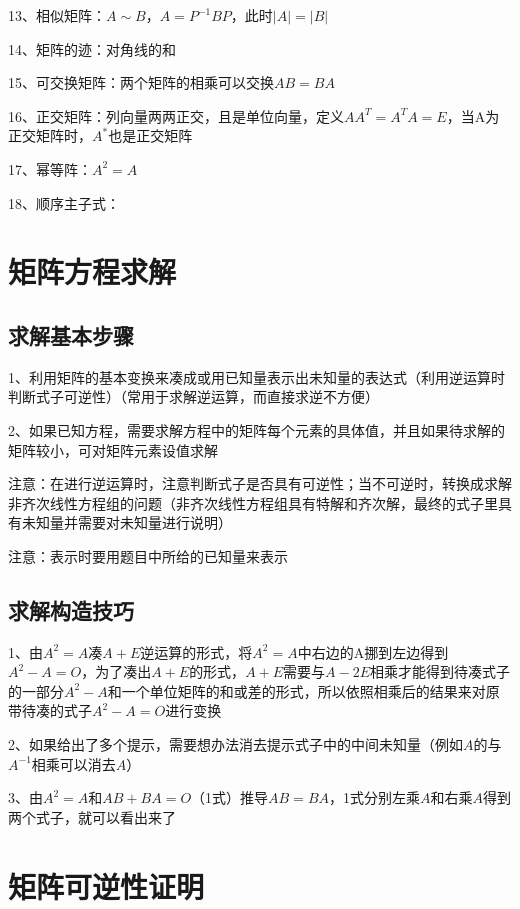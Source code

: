 13、相似矩阵：$ A \sim B $，$ A=P^{-1}BP $，此时$ |A|=|B| $

14、矩阵的迹：对角线的和

15、可交换矩阵：两个矩阵的相乘可以交换$ AB=BA $

16、正交矩阵：列向量两两正交，且是单位向量，定义$ AA^T=A^TA=E $，当A为正交矩阵时，$ A^* $也是正交矩阵

17、幂等阵：$ A^2=A $

18、顺序主子式：

\section{矩阵方程求解}



\subsection{求解基本步骤}

1、利用矩阵的基本变换来凑成或用已知量表示出未知量的表达式（利用逆运算时判断式子可逆性）（常用于求解逆运算，而直接求逆不方便）

2、如果已知方程，需要求解方程中的矩阵每个元素的具体值，并且如果待求解的矩阵较小，可对矩阵元素设值求解

注意：在进行逆运算时，注意判断式子是否具有可逆性；当不可逆时，转换成求解非齐次线性方程组的问题（非齐次线性方程组具有特解和齐次解，最终的式子里具有未知量并需要对未知量进行说明）

注意：表示时要用题目中所给的已知量来表示



\subsection{求解构造技巧}

1、由$ A^2=A $凑$ A+E $逆运算的形式，将$ A^2=A $中右边的A挪到左边得到$ A^2-A=O $，为了凑出$ A+E $的形式，$ A+E $需要与$ A-2E $相乘才能得到待凑式子的一部分$ A^2-A $和一个单位矩阵的和或差的形式，所以依照相乘后的结果来对原带待凑的式子$ A^2-A=O $进行变换

2、如果给出了多个提示，需要想办法消去提示式子中的中间未知量（例如$ A $的与$ A^{-1} $相乘可以消去$ A $）

3、由$ A^2=A $和$ AB+BA=O $（1式）推导$ AB=BA $，1式分别左乘$ A $和右乘$ A $得到两个式子，就可以看出来了

\section{矩阵可逆性证明}

